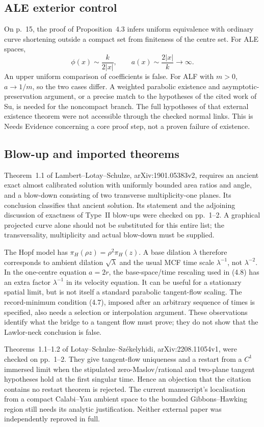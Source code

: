 \documentclass[10pt]{article}
\begin{document}
\subsection*{ALE exterior control}
On p. 15, the proof of Proposition 4.3 infers uniform equivalence with ordinary curve shortening outside a compact set from finiteness of the centre set. For ALE spaces, \[\phi(x)\sim\frac{k}{2|x|},\qquad a(x)\sim\frac{2|x|}{k}\longrightarrow\infty .\] An upper uniform comparison of coefficients is false. For ALF with \(m>0\), \(a\to1/m\), so the two cases differ. A weighted parabolic existence and asymptotic-preservation argument, or a precise match to the hypotheses of the cited work of Su, is needed for the noncompact branch. The full hypotheses of that external existence theorem were not accessible through the checked normal links. This is Needs Evidence concerning a core proof step, not a proven failure of existence.\par
\subsection*{Blow-up and imported theorems}
Theorem 1.1 of Lambert–Lotay–Schulze, arXiv:1901.05383v2, requires an ancient exact almost calibrated solution with uniformly bounded area ratios and angle, and a blow-down consisting of two transverse multiplicity-one planes. Its conclusion classifies that ancient solution. Its statement and the adjoining discussion of exactness of Type II blow-ups were checked on pp. 1–2. A graphical projected curve alone should not be substituted for this entire list; the transversality, multiplicity and actual blow-down must be supplied.\par
The Hopf model has \(\pi_H(\rho z)=\rho^2\pi_H(z)\). A base dilation \(\lambda\) therefore corresponds to ambient dilation \(\sqrt\lambda\) and the usual MCF time scale \(\lambda^{-1}\), not \(\lambda^{-2}\). In the one-centre equation \(a=2r\), the base-space/time rescaling used in (4.8) has an extra factor \(\lambda^{-1}\) in its velocity equation. It can be useful for a stationary spatial limit, but is not itself a standard parabolic tangent-flow scaling. The record-minimum condition (4.7), imposed after an arbitrary sequence of times is specified, also needs a selection or interpolation argument. These observations identify what the bridge to a tangent flow must prove; they do not show that the Lawlor-neck conclusion is false.\par
Theorems 1.1–1.2 of Lotay–Schulze–Székelyhidi, arXiv:2208.11054v1, were checked on pp. 1–2. They give tangent-flow uniqueness and a restart from a \(C^1\) immersed limit when the stipulated zero-Maslov/rational and two-plane tangent hypotheses hold at the first singular time. Hence an objection that the citation contains no restart theorem is rejected. The current manuscript’s localisation from a compact Calabi–Yau ambient space to the bounded Gibbons–Hawking region still needs its analytic justification. Neither external paper was independently reproved in full.\par
\end{document}
